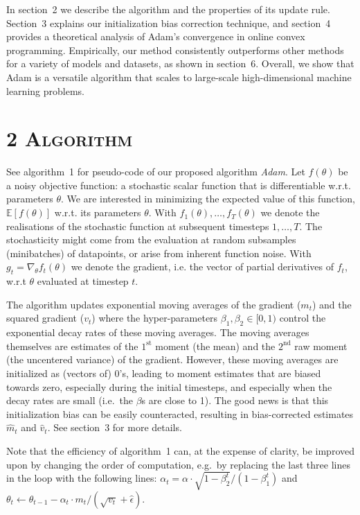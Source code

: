 \documentclass[11pt]{article}
\begin{document}
\vspace{1em}

\noindent
In section~2 we describe the algorithm and the properties of its
update rule. Section~3 explains our initialization bias correction
technique, and section~4 provides a theoretical analysis of Adam's
convergence in online convex programming. Empirically, our method
consistently outperforms other methods for a variety of models and
datasets, as shown in section~6. Overall, we show that Adam is a
versatile algorithm that scales to large-scale high-dimensional
machine learning problems.

\section*{2 \textsc{Algorithm}}

See algorithm~1 for pseudo-code of our proposed algorithm
\emph{Adam}. Let $f(\theta)$ be a noisy objective function: a
stochastic scalar function that is differentiable w.r.t. parameters
$\theta$. We are interested in minimizing the expected value of
this function, $\mathbb{E}[f(\theta)]$ w.r.t. its parameters
$\theta$. With $f_1(\theta), \ldots, f_T(\theta)$ we denote the
realisations of the stochastic function at subsequent timesteps
$1, \ldots, T$. The stochasticity might come from the evaluation
at random subsamples (minibatches) of datapoints, or arise from
inherent function noise. With
$g_t = \nabla_\theta f_t(\theta)$ we denote the gradient, i.e.
the vector of partial derivatives of $f_t$, w.r.t $\theta$
evaluated at timestep $t$.

The algorithm updates exponential moving averages of the gradient
($m_t$) and the squared gradient ($v_t$) where the hyper-parameters
$\beta_1, \beta_2 \in [0, 1)$ control the exponential decay rates of
these moving averages. The moving averages themselves are estimates
of the $1^\text{st}$ moment (the mean) and the $2^\text{nd}$ raw
moment (the uncentered variance) of the gradient. However, these
moving averages are initialized as (vectors of) 0's, leading to
moment estimates that are biased towards zero, especially during
the initial timesteps, and especially when the decay rates are
small (i.e.\ the $\beta$s are close to 1). The good news is that
this initialization bias can be easily counteracted, resulting in
bias-corrected estimates $\widehat{m}_t$ and $\widehat{v}_t$. See
section~3 for more details.

Note that the efficiency of algorithm~1 can, at the expense of
clarity, be improved upon by changing the order of computation,
e.g.\ by replacing the last three lines in the loop with the
following lines:
$\alpha_t = \alpha \cdot \sqrt{1 - \beta_2^t}/(1 - \beta_1^t)$
and
$\theta_t \leftarrow \theta_{t-1} - \alpha_t \cdot m_t/(\sqrt{v_t} + \hat{\epsilon})$.
\end{document}
